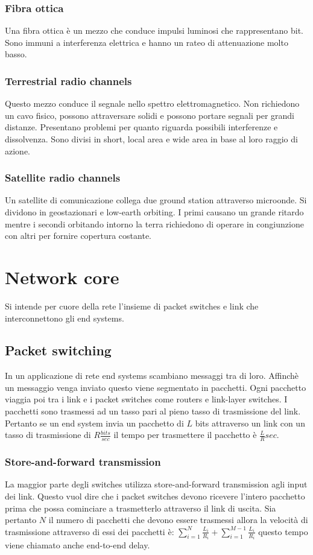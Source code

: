 \subsubsection{Fibra ottica}
Una fibra ottica \`e un mezzo che conduce impulsi luminosi che rappresentano bit. Sono immuni a interferenza elettrica e hanno un rateo di attenuazione molto basso. 
\subsubsection{Terrestrial radio channels}
Questo mezzo conduce il segnale nello spettro elettromagnetico. Non richiedono un cavo fisico, possono attraversare solidi e possono portare segnali per grandi distanze. Presentano problemi per quanto 
riguarda possibili interferenze e dissolvenza. Sono divisi in short, local area e wide area in base al loro raggio di azione. 
\subsubsection{Satellite radio channels}
Un satellite di comunicazione collega due ground station attraverso microonde. Si dividono in geostazionari e low-earth orbiting. I primi causano un grande ritardo mentre i secondi orbitando intorno la terra
richiedono di operare in congiunzione con altri per fornire copertura costante. 
\section{Network core}
Si intende per cuore della rete l'insieme di packet switches e link che interconnettono gli end systems.
\subsection{Packet switching}
In un applicazione di rete end systems scambiano messaggi tra di loro. Affinch\`e un messaggio venga inviato questo viene segmentato in pacchetti. Ogni pacchetto viaggia poi tra i link e i packet switches come
routers e link-layer switches. I pacchetti sono trasmessi ad un tasso pari al pieno tasso di trasmissione del link. Pertanto se un end system invia un pacchetto di $L$ bits attraverso un link con un tasso di 
trasmissione di $R\frac{bits}{sec}$ il tempo per trasmettere il pacchetto \`e $\frac{L}{R}sec$.
\subsubsection{Store-and-forward transmission}
La maggior parte degli switches utilizza store-and-forward transmission agli input dei link. Questo vuol dire che i packet switches devono ricevere l'intero pacchetto prima che possa cominciare a trasmetterlo 
attraverso il link di uscita. Sia pertanto $N$ il numero di pacchetti che devono essere trasmessi allora la velocit\`a di trasmissione attraverso di essi dei pacchetti \`e: $\sum\limits_{i=1}^N\frac{L_i}{R_i}+
\sum\limits_{i=1}^{M-1}\frac{L_i}{R_i}$ questo tempo viene chiamato anche end-to-end delay. 
